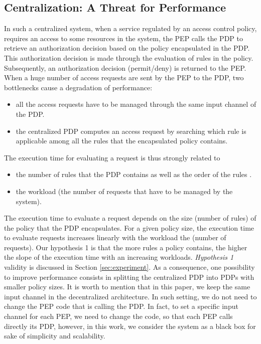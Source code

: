 \subsection{Centralization: A Threat for Performance}
In such a centralized system, when a service regulated by an access control policy, requires an access to some resources in the system, the PEP calls the PDP to 
retrieve an authorization decision based on the policy encapsulated in the PDP. This authorization decision is made through the evaluation of rules in the policy. 
Subsequently, an authorization decision (permit/deny) is returned to the PEP. When a huge number of access requests are sent by the PEP to the PDP, two bottlenecks cause a degradation of performance:
\begin{itemize}
 \item all the access requests have to be managed through the same input channel of the PDP. 
 \item the centralized PDP computes an access request by searching which rule is applicable among all the rules that the encapsulated policy contains.
\end{itemize}

The execution time for evaluating a request is thus strongly related to
\begin{itemize} 
\item the number of rules that the PDP contains as well as the order of the rules \cite{clustering}.
\item the workload (the number of requests that have to be managed by the system).
\end{itemize}
The execution time to evaluate a request depends on the size (number of rules) of the policy that the PDP encapsulates. For a given policy size, the execution time  to evaluate
 requests increases linearly with the workload the (number of requests). Our hypothesis 1 is that the more rules a policy contains, the higher the slope of the execution time with an increasing workloads. 
 \textit{Hypothesis 1} validity is discussed in Section \ref{sec:experiment}.
As a consequence, one possibility to improve performance consists in splitting the centralized PDP into PDPs with smaller policy sizes. 
It is worth to mention that in this paper, we keep the same input channel in the decentralized architecture. In such setting, we do not need to change the PEP code that is calling 
the PDP. In fact, to set a specific input channel for each PEP, we need to change the code, so that each PEP calls directly its PDP, however, in this work, we consider the system as
 a black box for sake of simplicity and scalability.  


